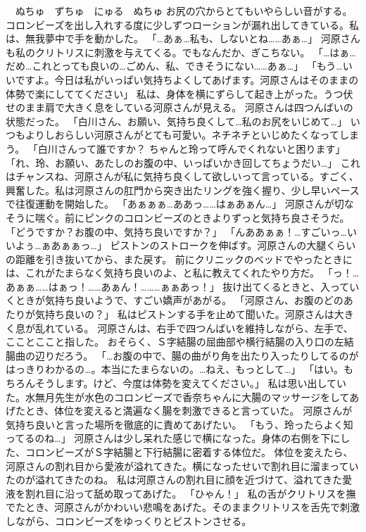 　ぬちゅ　ずちゅ　にゅる　ぬちゅ
お尻の穴からとてもいやらしい音がする。コロンビーズを出し入れする度に少しずつローションが漏れ出してきている。私は、無我夢中で手を動かした。
「…あぁ…私も、しないとね……あぁ…」
河原さんも私のクリトリスに刺激を与えてくる。でもなんだか、ぎこちない。
「…はぁ…だめ…これとっても良いの…ごめん、私、できそうにない……あぁ…」
「もう…いいですよ。今日は私がいっぱい気持ちよくしてあげます。河原さんはそのままの体勢で楽にしててください」
私は、身体を横にずらして起き上がった。うつ伏せのまま肩で大きく息をしている河原さんが見える。
河原さんは四つんばいの状態だった。
「白川さん、お願い、気持ち良くして…私のお尻をいじめて…」
いつもよりしおらしい河原さんがとても可愛い。ネチネチといじめたくなってしまう。
「白川さんって誰ですか？ ちゃんと玲って呼んでくれないと困ります」
「れ、玲、お願い、あたしのお腹の中、いっぱいかき回してちょうだい…」
これはチャンスね、河原さんが私に気持ち良くして欲しいって言っている。すごく、興奮した。私は河原さんの肛門から突き出たリングを強く握り、少し早いペースで往復運動を開始した。
「あぁぁぁ…ああっ……はぁあぁん…」
河原さんが切なそうに喘ぐ。前にピンクのコロンビーズのときよりずっと気持ち良さそうだ。
「どうですか？お腹の中、気持ち良いですか？」
「んああぁぁ！…すごいっ…いいよぅ…ぁあぁぁっ…」
ピストンのストロークを伸ばす。河原さんの大腿くらいの距離を引き抜いてから、また戻す。
前にクリニックのベッドでやったときには、これがたまらなく気持ち良いのよ、と私に教えてくれたやり方だ。
「っ！…あぁぁ……はぁっ！……あぁん！………ぁぁあっ！」
抜け出てくるときと、入っていくときが気持ち良いようで、すごい嬌声があがる。
「河原さん、お腹のどのあたりが気持ち良いの？」
私はピストンする手を止めて聞いた。河原さんは大きく息が乱れている。
河原さんは、右手で四つんばいを維持しながら、左手で、こことここと指した。
おそらく、Ｓ字結腸の屈曲部や横行結腸の入り口の左結腸曲の辺りだろう。
「…お腹の中で、腸の曲がり角を出たり入ったりしてるのがはっきりわかるの…。本当にたまらないの。…ねえ、もっとして…」
「はい。もちろんそうします。けど、今度は体勢を変えてください。」
私は思い出していた。水無月先生が水色のコロンビーズで香奈ちゃんに大腸のマッサージをしてあげたとき、体位を変えると満遍なく腸を刺激できると言っていた。
河原さんが気持ち良いと言った場所を徹底的に責めてあげたい。
「もう、玲ったらよく知ってるのね…」
河原さんは少し呆れた感じで横になった。身体の右側を下にした、コロンビーズがＳ字結腸と下行結腸に密着する体位だ。
体位を変えたら、河原さんの割れ目から愛液が溢れてきた。横になったせいで割れ目に溜まっていたのが溢れてきたのね。
私は河原さんの割れ目に顔を近づけて、溢れてきた愛液を割れ目に沿って舐め取ってあげた。
「ひゃん！」
私の舌がクリトリスを撫でたとき、河原さんがかわいい悲鳴をあげた。そのままクリトリスを舌先で刺激しながら、コロンビーズをゆっくりとピストンさせる。
